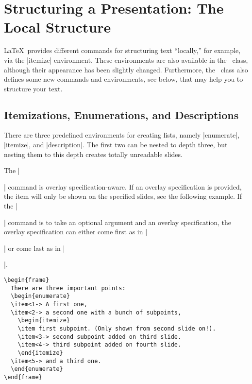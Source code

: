 %
%
%

\section{Structuring a Presentation: The Local Structure}

\LaTeX\ provides different commands for structuring text ``locally,'' for example, via the |itemize| environment. These environments are also available in the \beamer\ class, although their appearance has been slightly changed. Furthermore, the \beamer\ class also defines some new commands and environments, see below, that may help you to structure your text.


\subsection{Itemizations, Enumerations, and Descriptions}
\label{section-enumerate}

There are three predefined environments for creating lists, namely |enumerate|, |itemize|, and |description|. The first two can be nested to depth three, but nesting them to this depth creates totally unreadable slides.

The |\item| command is overlay specification-aware. If an overlay specification is provided, the item will only be shown on the specified slides, see the following example. If the |\item| command is to take an optional argument and an overlay specification, the overlay specification can either come first as in |\item<1>[Cat]| or come last as in |\item[Cat]<1>|.
\begin{verbatim}
\begin{frame}
  There are three important points:
  \begin{enumerate}
  \item<1-> A first one,
  \item<2-> a second one with a bunch of subpoints,
    \begin{itemize}
    \item first subpoint. (Only shown from second slide on!).
    \item<3-> second subpoint added on third slide.
    \item<4-> third subpoint added on fourth slide.
    \end{itemize}
  \item<5-> and a third one.
  \end{enumerate}
\end{frame}
\end{verbatim}

